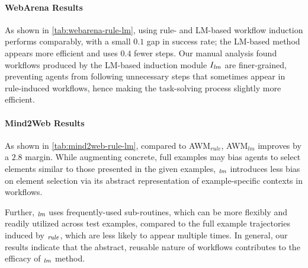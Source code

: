 \paragraph{WebArena Results}
As shown in \autoref{tab:webarena-rule-lm}, using rule- and LM-based workflow induction performs comparably, with a small $0.1$ gap in success rate; the LM-based method appears more efficient and uses $0.4$ fewer steps. 
Our manual analysis found workflows produced by the LM-based induction module $I_{\it lm}$ are finer-grained, preventing agents from following unnecessary steps that sometimes appear in rule-induced workflows, hence making the task-solving process slightly more efficient.



\paragraph{Mind2Web Results}
As shown in \autoref{tab:mind2web-rule-lm}, compared to \textsc{AWM$_{rule}$}, \textsc{AWM}$_{lm}$ improves by a $2.8$ margin.
While augmenting concrete, full examples may bias agents to select elements similar to those presented in the given examples, \awm$_{\it lm}$ introduces less bias on element selection via its abstract representation of example-specific contexts in workflows.

\begin{table}
\small
\vspace{-4mm}
\caption{\awm results with different workflow induction methods on Mind2Web cross-task dataset.}
\vspace{1mm}
\label{tab:mind2web-rule-lm}
\vspace{-2mm}
\end{table}
%

Further, \awm$_{\it lm}$ uses frequently-used sub-routines, which can be more flexibly and readily utilized across test examples, compared to the full example trajectories induced by \awm$_{\it rule}$, which are less likely to appear multiple times.
In general, our results indicate that the abstract, reusable nature of workflows contributes to the efficacy of \awm$_{\it lm}$ method.



